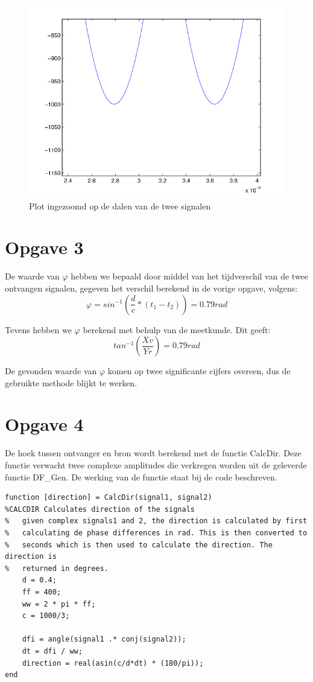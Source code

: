 \documentclass{article}
\begin{document}
\begin{figure}
	\begin{center}
	\includegraphics{2b.png}
	\caption{Plot ingezoomd op de dalen van de twee signalen}
	\end{center}
 \label{2b}
\end{figure}

\section{Opgave 3}
De waarde van \begin{math}\varphi\end{math} hebben we bepaald door middel van het tijdverschil van de twee ontvangen signalen, gegeven het verschil berekend in de vorige opgave, volgens:
$$\varphi = sin^{-1}(\frac{d}{c} * (t_{1} - t_{2})) = 0.79 rad$$

Tevens hebben we $\varphi$ berekend met behulp van de meetkunde. Dit geeft:
$$tan^{-1} (\frac{Xv}{Yr}) = 0.79rad$$

De gevonden waarde van $\varphi$ komen op twee significante cijfers overeen, dus de gebruikte methode blijkt te werken.

\section{Opgave 4}

De hoek tussen ontvanger en bron wordt berekend met de functie CalcDir. Deze functie verwacht twee complexe amplitudes die verkregen worden uit de geleverde functie DF\_Gen. De werking van de functie staat bij de code beschreven. 
\begin{lstlisting}
function [direction] = CalcDir(signal1, signal2)
%CALCDIR Calculates direction of the signals
%   given complex signals1 and 2, the direction is calculated by first
%   calculating de phase differences in rad. This is then converted to
%   seconds which is then used to calculate the direction. The direction is
%   returned in degrees.
    d = 0.4;
    ff = 400;
    ww = 2 * pi * ff;
    c = 1000/3;
    
    dfi = angle(signal1 .* conj(signal2));
    dt = dfi / ww;
    direction = real(asin(c/d*dt) * (180/pi));
end
\end{lstlisting}
\end{document}
